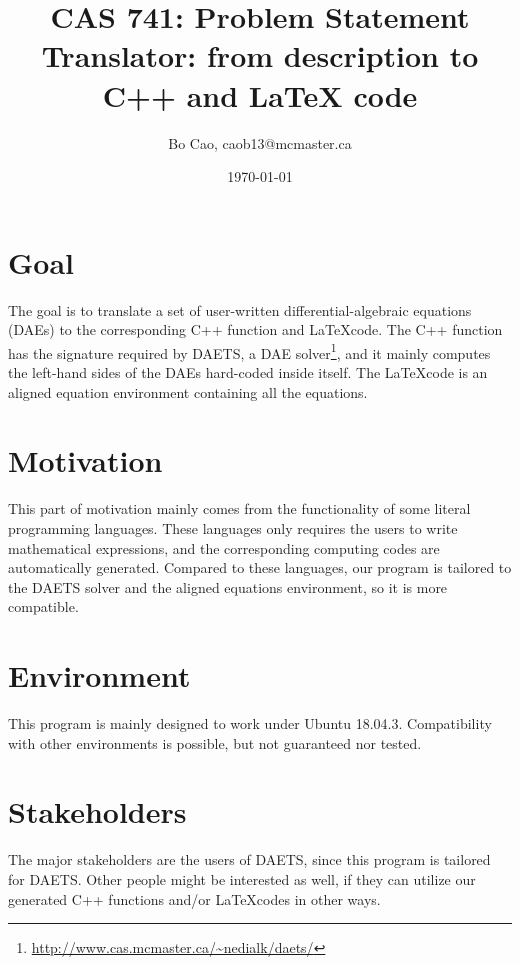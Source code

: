 \documentclass{article}
\title{CAS 741: Problem Statement\\Translator: from description to C++ and \LaTeX\xspace code}
\author{Bo Cao, caob13@mcmaster.ca}
\date{\today}
\begin{document}
\maketitle
\section{Goal}
The goal is to translate a set of user-written differential-algebraic equations (DAEs) to the corresponding C++ function and \LaTeX code. The C++ function has the signature required by DAETS, a DAE solver\footnote{\url{ http://www.cas.mcmaster.ca/~nedialk/daets/}}, and it mainly computes the left-hand sides of the DAEs hard-coded inside itself. The \LaTeX code is an aligned equation environment containing all the equations.

\section{Motivation}
This part of motivation mainly comes from the functionality of some literal programming languages. These languages only requires the users to write mathematical expressions, and the corresponding computing codes are automatically generated. Compared to these languages, our program is tailored to the DAETS solver and the aligned equations environment, so it is more compatible.

\section{Environment}
This program is mainly designed to work under Ubuntu 18.04.3. Compatibility with other environments is possible, but not guaranteed nor tested.

\section{Stakeholders}
The major stakeholders are the users of DAETS, since this program is tailored for DAETS. Other people might be interested as well, if they can utilize our generated C++ functions and/or \LaTeX codes in other ways.
 
%
%
%
%
\end{document}
